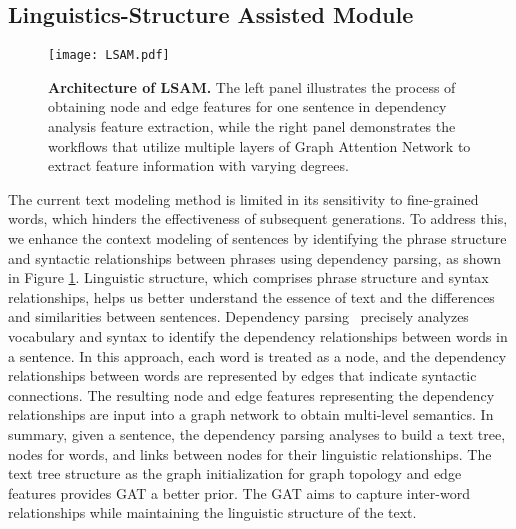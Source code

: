 \documentclass[10pt,twocolumn,letterpaper]{article}
\begin{document}
\subsection{Linguistics-Structure Assisted Module}
\label{sec:LSAM}

\begin{figure}[t]
  \centering
  \texttt{[image: LSAM.pdf]}
  \caption{\textbf{Architecture of LSAM.}
  The left panel illustrates the process of obtaining node and edge features for one sentence in dependency analysis feature extraction, while the right panel demonstrates the workflows that utilize multiple layers of Graph Attention Network to extract feature information with varying degrees.}
\label{fig:LSAM}
\end{figure}

The current text modeling method is limited in its sensitivity to fine-grained words, which hinders the effectiveness of subsequent generations. To address this, we enhance the context modeling of sentences by identifying the phrase structure and syntactic relationships between phrases using dependency parsing, as shown in Figure \ref{fig:LSAM}. Linguistic structure, which comprises phrase structure and syntax relationships, helps us better understand the essence of text and the differences and similarities between sentences. Dependency parsing~\cite{nivre2008algorithms} precisely analyzes vocabulary and syntax to identify the dependency relationships between words in a sentence. In this approach, each word is treated as a node, and the dependency relationships between words are represented by edges that indicate syntactic connections. The resulting node and edge features representing the dependency relationships are input into a graph network to obtain multi-level semantics.
In summary, given a sentence, the dependency parsing analyses to build a text tree, nodes for words, and links between nodes for their linguistic relationships. The text tree structure as the graph initialization for graph topology and edge features provides GAT a better prior. The GAT aims to capture inter-word relationships while maintaining the linguistic structure of the text.
\end{document}
